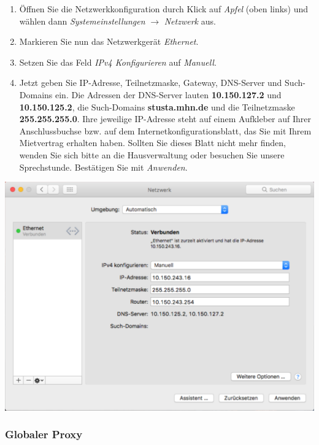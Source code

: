 \documentclass[a4paper,12pt]{scrartcl}
\begin{document}
\begin{minipage}{0.6\textwidth}
\begin{enumerate}
    \item Öffnen Sie die Netzwerkkonfiguration durch Klick auf \emph{Apfel} (oben links) und wählen dann \emph{Systemeinstellungen} $\rightarrow$ \emph{Netzwerk} aus.
    \item Markieren Sie nun das Netzwerkgerät \emph{Ethernet}.
    \item Setzen Sie das Feld \emph{IPv4 Konfigurieren} auf \emph{Manuell}.
    \item Jetzt geben Sie IP-Adresse, Teilnetzmaske, Gateway, DNS-Server und Such-Domains ein. Die Adressen der DNS-Server lauten \textbf{10.150.127.2} und \textbf{10.150.125.2}, die Such-Domains \textbf{stusta.mhn.de} und die Teilnetzmaske \textbf{255.255.255.0}. Ihre jeweilige IP-Adresse steht auf einem Aufkleber auf Ihrer Anschlussbuchse bzw. auf dem Internetkonfigurationsblatt, das Sie mit Ihrem Mietvertrag erhalten haben. Sollten Sie dieses Blatt nicht mehr finden, wenden Sie sich bitte an die Hausverwaltung oder besuchen Sie unsere Sprechstunde.
    Bestätigen Sie mit \emph{Anwenden}.
\end{enumerate}
\end{minipage}
\begin{minipage}{0.4\textwidth}
	\centering
	\includegraphics[width=\linewidth,keepaspectratio]{Bilder/IP_MAC}
\end{minipage}

\subsubsection*{Globaler Proxy}
\end{document}
